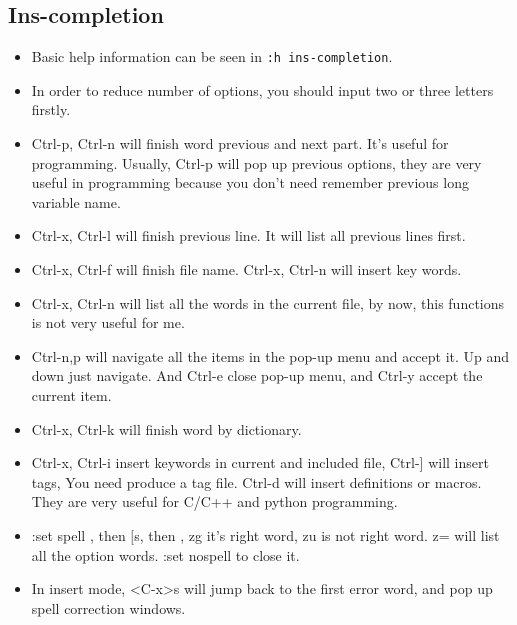 \documentclass[a4paper,12pt,twoside]{book}
\begin{document}
\subsection{Ins-completion}
\begin{itemize}
		\item Basic help information can be seen in \texttt{:h ins-completion}. 

		\item In order to reduce number of options, you should input two or three letters firstly.

\item Ctrl-p, Ctrl-n will finish word previous and next part. It's useful for programming. Usually, Ctrl-p will pop up previous options, they are very useful in programming because you don't need remember previous long variable name. 

	   \item Ctrl-x, Ctrl-l will finish previous line. It will list all previous lines first. 

		\item Ctrl-x, Ctrl-f will finish file name. Ctrl-x, Ctrl-n will insert key words.
		
		\item Ctrl-x, Ctrl-n will list all the words in the current file, by now, this functions is not very useful for me. 

		\item Ctrl-n,p will navigate all the items in the pop-up menu and accept it. Up and down just navigate. And Ctrl-e close pop-up menu, and Ctrl-y accept the current item. 

		\item Ctrl-x, Ctrl-k will finish word by dictionary. 

		\item Ctrl-x, Ctrl-i insert keywords in current and included file,  Ctrl-] will insert tags, You need produce a tag file. Ctrl-d will insert definitions or macros. They are very useful for C/C++ and python programming.

		\item :set spell , then $[$s, then , zg it's right word,  zu is not right word. z= will list all the option words. :set nospell to close it.

		\item In insert mode, <C-x>s will jump back to the first error word, and pop up spell correction windows. 
\end{itemize}
\end{document}

